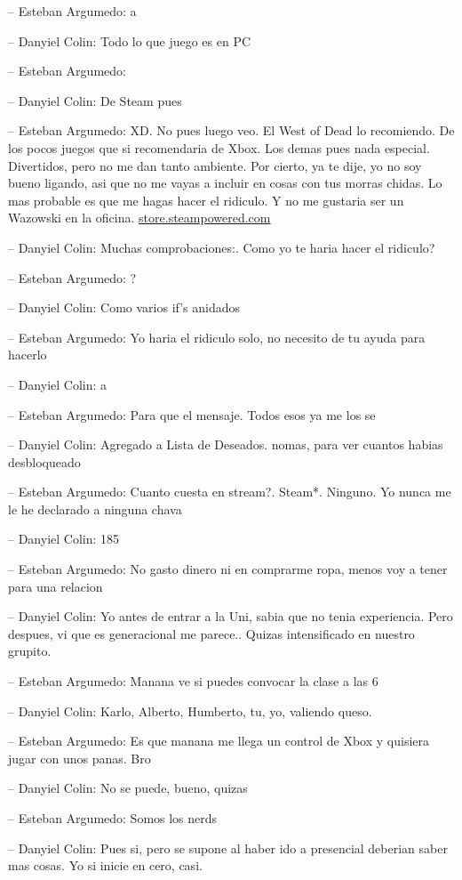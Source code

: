 -- Esteban Argumedo: a

-- Danyiel Colin: Todo lo que juego es en PC

-- Esteban Argumedo:

-- Danyiel Colin: De Steam pues

-- Esteban Argumedo: XD. No pues luego veo. El West of Dead lo
recomiendo. De los pocos juegos que si recomendaria de Xbox. Los demas
pues nada especial. Divertidos, pero no me dan tanto ambiente. Por
cierto, ya te dije, yo no soy bueno ligando, asi que no me vayas a
incluir en cosas con tus morras chidas. Lo mas probable es que me hagas
hacer el ridiculo. Y no me gustaria ser un Wazowski en la oficina.
\href{https://store.steampowered.com/app/1016790/West_of_Dead/}{store.steampowered.com}

-- Danyiel Colin: Muchas comprobaciones:. Como yo te haria hacer el
ridiculo?

-- Esteban Argumedo: ?

-- Danyiel Colin: Como varios if's anidados

-- Esteban Argumedo: Yo haria el ridiculo solo, no necesito de tu ayuda
para hacerlo

-- Danyiel Colin: a

-- Esteban Argumedo: Para que el mensaje. Todos esos ya me los se

-- Danyiel Colin: Agregado a Lista de Deseados. nomas, para ver cuantos
habias desbloqueado

-- Esteban Argumedo: Cuanto cuesta en stream?. Steam*. Ninguno. Yo nunca
me le he declarado a ninguna chava

-- Danyiel Colin: 185

-- Esteban Argumedo: No gasto dinero ni en comprarme ropa, menos voy a
tener para una relacion

-- Danyiel Colin: Yo antes de entrar a la Uni, sabia que no tenia
experiencia. Pero despues, vi que es generacional me parece.. Quizas
intensificado en nuestro grupito.

-- Esteban Argumedo: Manana ve si puedes convocar la clase a las 6

-- Danyiel Colin: Karlo, Alberto, Humberto, tu, yo, valiendo queso.

-- Esteban Argumedo: Es que manana me llega un control de Xbox y
quisiera jugar con unos panas. Bro

-- Danyiel Colin: No se puede, bueno, quizas

-- Esteban Argumedo: Somos los nerds

-- Danyiel Colin: Pues si, pero se supone al haber ido a presencial
deberian saber mas cosas. Yo si inicie en cero, casi.

